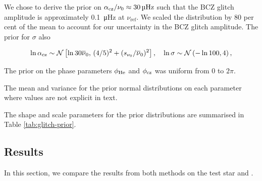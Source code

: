 We chose to derive the prior on \(\alpha_{{\mathrm{cz}}}/\nu_0 \approx \SI{30}{\micro\hertz}\) such that the BCZ glitch amplitude is approximately \SI{0.1}{\micro\hertz} at \(\nu_\mathrm{ref}\). We scaled the distribution by 80 per cent of the mean to account for our uncertainty in the BCZ glitch amplitude. The prior for \(\sigma\) also

\begin{equation*}
    \ln\alpha_{{\mathrm{cz}}} \sim \mathcal{N}\left[ \ln 30\overline{\nu}_0, \, (4/5)^2 + (s_{\nu_0}/\overline{\nu}_0)^2\right], \quad \ln\sigma \sim \mathcal{N}\left( - \ln 100, 4\right),
\end{equation*}

The prior on the phase parameters \(\phi_{{\mathrm{He}}}\) and \(\phi_{{\mathrm{cz}}}\) was uniform from 0 to \(2\pi\). 

\begin{table}
    \centering
    \caption{The mean and variance for the prior normal distributions on each parameter where values are not explicit in text. }
    \label{tab:glitch-prior}
    
\end{table}

The shape and scale parameters for the prior distributions are summarised in Table \ref{tab:glitch-prior}. 



\subsection{Results}

In this section, we compare the results from both methods on the test star and .

